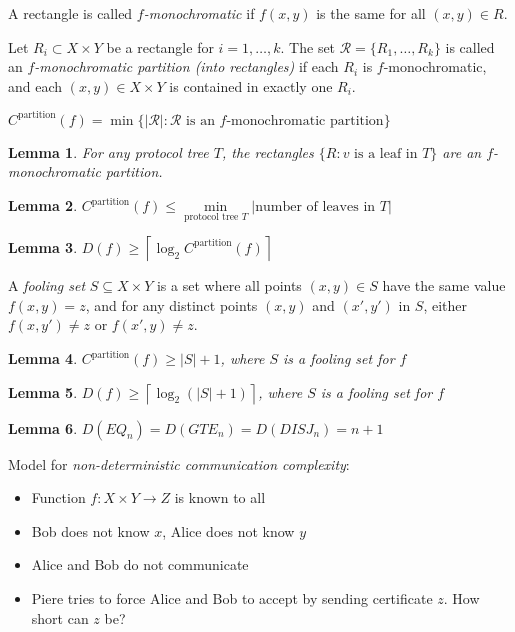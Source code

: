 \documentclass[letterpaper,landscape,11pt]{article}
\newtheorem{lemma}{Lemma}
\begin{document}
A rectangle is called \emph{$f$-monochromatic} if $f(x, y)$ is the same for all $(x, y) \in R$.

Let $R_i \subset X \times Y$ be a rectangle for $i = 1, \dots, k$. The set $\mathcal{R} = \{R_1, \dots, R_k\}$ is called an \emph{$f$-monochromatic partition (into rectangles)} if each $R_i$ is $f$-monochromatic, and each $(x, y) \in X \times Y$ is contained in exactly one $R_i$.

$C^{\text{partition}}(f) = \min \{|\mathcal{R}| : \mathcal{R} \text{ is an }f\text{-monochromatic partition}\}$

\begin{lemma}
	For any protocol tree $T$, the rectangles $\{R : v \text{ is a leaf in } T\}$ are an $f$-monochromatic partition.
\end{lemma}

\begin{lemma}
	$C^{\text{partition}}(f) \leq \min\limits_{\text{protocol tree } T} |\text{number of leaves in } T|$
\end{lemma}

\begin{lemma}
	$D(f) \geq \left \lceil \log_2 C^{\text{partition}}(f) \right \rceil$
\end{lemma}

A \emph{fooling set} $S \subseteq X \times Y$ is a set where all points $(x, y) \in S$ have the same value $f(x, y) = z$, and for any distinct points $(x, y)$ and $(x', y')$ in $S$, either $f(x, y') \neq z$ or $f(x', y) \neq z$.

\begin{lemma}
	$C^{\text{partition}}(f) \geq |S| + 1$, where $S$ is a fooling set for $f$
\end{lemma}

\begin{lemma}
	$D(f) \geq \left \lceil \log_2(|S| + 1) \right \rceil$, where $S$ is a fooling set for $f$
\end{lemma}

\begin{lemma}
	$D(EQ_n) = D(GTE_n) = D(DISJ_n) = n + 1$
\end{lemma}

Model for \emph{non-deterministic communication complexity}:
\begin{itemize}
	\item Function $f : X \times Y \rightarrow Z$ is known to all
	\item Bob does not know $x$, Alice does not know $y$
	\item Alice and Bob do not communicate
	\item Piere tries to force Alice and Bob to accept by sending certificate $z$. How short can $z$ be?
\end{itemize}
\end{document}
